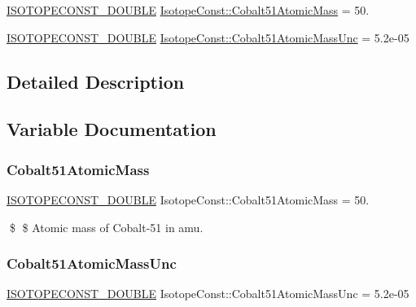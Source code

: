 \begin{DoxyCompactItemize}
\item 
\mbox{\hyperlink{group___isotope_const-_macros_ga8f45a7272ce02c0b4c65c44636ed719a}{I\+S\+O\+T\+O\+P\+E\+C\+O\+N\+S\+T\+\_\+\+D\+O\+U\+B\+LE}} \mbox{\hyperlink{group___isotope_const-_cobalt-_co51_ga6eb69925ada48bd7d4c8ea390ca91d7f}{Isotope\+Const\+::\+Cobalt51\+Atomic\+Mass}} = 50.
\item 
\mbox{\hyperlink{group___isotope_const-_macros_ga8f45a7272ce02c0b4c65c44636ed719a}{I\+S\+O\+T\+O\+P\+E\+C\+O\+N\+S\+T\+\_\+\+D\+O\+U\+B\+LE}} \mbox{\hyperlink{group___isotope_const-_cobalt-_co51_gaa607ff96b492b7d5a62e3dd995f484d5}{Isotope\+Const\+::\+Cobalt51\+Atomic\+Mass\+Unc}} = 5.\+2e-\/05
\end{DoxyCompactItemize}


\subsection{Detailed Description}


\subsection{Variable Documentation}
\mbox{\label{group___isotope_const-_cobalt-_co51_ga6eb69925ada48bd7d4c8ea390ca91d7f}} 
\subsubsection{\texorpdfstring{Cobalt51\+Atomic\+Mass}{Cobalt51AtomicMass}}
{\footnotesize\ttfamily \mbox{\hyperlink{group___isotope_const-_macros_ga8f45a7272ce02c0b4c65c44636ed719a}{I\+S\+O\+T\+O\+P\+E\+C\+O\+N\+S\+T\+\_\+\+D\+O\+U\+B\+LE}} Isotope\+Const\+::\+Cobalt51\+Atomic\+Mass = 50.}

\$ \$ Atomic mass of Cobalt-\/51 in amu. \mbox{\label{group___isotope_const-_cobalt-_co51_gaa607ff96b492b7d5a62e3dd995f484d5}} 
\subsubsection{\texorpdfstring{Cobalt51\+Atomic\+Mass\+Unc}{Cobalt51AtomicMassUnc}}
{\footnotesize\ttfamily \mbox{\hyperlink{group___isotope_const-_macros_ga8f45a7272ce02c0b4c65c44636ed719a}{I\+S\+O\+T\+O\+P\+E\+C\+O\+N\+S\+T\+\_\+\+D\+O\+U\+B\+LE}} Isotope\+Const\+::\+Cobalt51\+Atomic\+Mass\+Unc = 5.\+2e-\/05}

